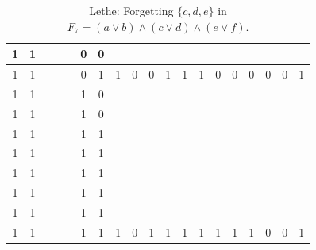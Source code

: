 \begin{table}[!tb]
\begin{tabular}{|c|c|c|c|c|c|c|c|c|c|c|c|c|c|c|c|c|c|c|}
        \rowcolor{blue!40} 1 & 1 &  &  &  & 0 & 0 &  &  &  &  &  &  &  &  &  &  &  &  \\ \hline
        \rowcolor{blue!40} 1 & 1 &  &  &  & 0 & 1 & 1 & 0 & 0 & 1 & 1 & 1 & 0 & 0 & 0 & 0 & 0 & 1 \\ \hline
        \rowcolor{red!40} 1 & 1 &  &  &  & 1 & 0 &  &  &  &  &  &  &  &  &  &  &  &  \\ \hline
        \rowcolor{red!40} 1 & 1 &  &  &  & 1 & 0 &  &  &  &  &  &  &  &  &  &  &  &  \\ \hline
        \rowcolor{red!40} 1 & 1 &  &  &  & 1 & 1 &  &  &  &  &  &  &  &  &  &  &  &  \\ \hline
        \rowcolor{red!40} 1 & 1 &  &  &  & 1 & 1 &  &  &  &  &  &  &  &  &  &  &  &  \\ \hline
        \rowcolor{red!40} 1 & 1 &  &  &  & 1 & 1 &  &  &  &  &  &  &  &  &  &  &  &  \\ \hline
        \rowcolor{red!40} 1 & 1 &  &  &  & 1 & 1 &  &  &  &  &  &  &  &  &  &  &  &  \\ \hline
        \rowcolor{red!40} 1 & 1 &  &  &  & 1 & 1 &  &  &  &  &  &  &  &  &  &  &  &  \\ \hline
        \rowcolor{red!40} 1 & 1 &  &  &  & 1 & 1 & 1 & 0 & 1 & 1 & 1 & 1 & 1 & 1 & 1 & 0 & 0 & 1 \\ \hline
    \end{tabular}
    \caption{Lethe: Forgetting $\{c, d, e\}$ in $F_{7} = (a \lor b) \land (c \lor d) \land (e \lor f)$.}
    \label{tab:lethe-F7-cde}
\end{table}
